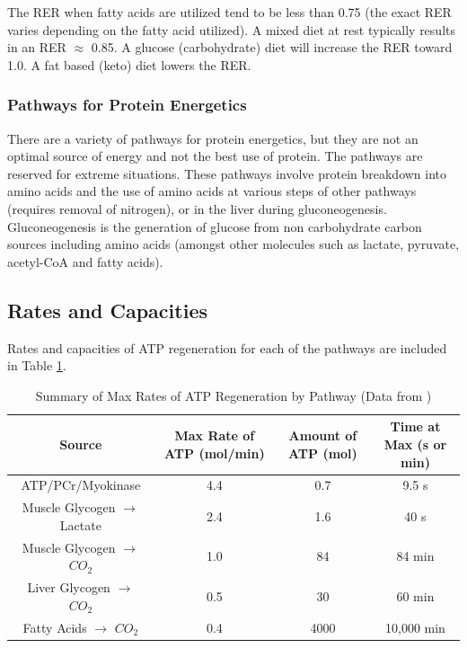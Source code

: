 The RER when fatty acids are utilized tend to be less than 0.75 (the exact RER varies depending on the fatty acid utilized). A mixed diet at rest typically results in an RER $\approx$ 0.85. A glucose (carbohydrate) diet will increase the RER toward 1.0. A fat based (keto) diet lowers the RER.

\subsubsection{Pathways for Protein Energetics}

There are a variety of pathways for protein energetics, but they are not an optimal source of energy and not the best use of protein. The pathways are reserved for extreme situations. These pathways involve protein breakdown into amino acids and the use of amino acids at various steps of other pathways (requires removal of nitrogen), or in the liver during gluconeogenesis. Gluconeogenesis is the generation of glucose from non carbohydrate carbon sources including amino acids (amongst other molecules such as lactate, pyruvate, acetyl-CoA and fatty acids).


\subsection{Rates and Capacities}

Rates and capacities of ATP regeneration for each of the pathways are included in Table \ref{table:ATP_Rates}.

\begin{table}[h!]
\centering
\begin{tabular}{||c c c c||} 
 \hline
Source & Max Rate of ATP (mol/min) & Amount of ATP (mol) & Time at Max (s or min)\\ [0.5ex] 
 \hline\hline
 ATP/PCr/Myokinase & 4.4  & 0.7 & 9.5 s \\
 Muscle Glycogen $\rightarrow$ Lactate &  2.4 & 1.6 & 40 s \\ 
 Muscle Glycogen $\rightarrow$ $CO_2$ & 1.0 & 84 & 84 min\\
 Liver Glycogen $\rightarrow$ $CO_2$  & 0.5 & 30 & 60 min \\ 
 Fatty Acids $\rightarrow$ $CO_2$ & 0.4 & 4000 & 10,000 min \\[1ex] 
 \hline
\end{tabular}
\caption{Summary of Max Rates of ATP Regeneration by Pathway (\footnotesize{Data from \cite{feher_quantitative_2017}})}
\label{table:ATP_Rates}
\end{table}

